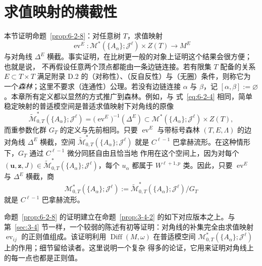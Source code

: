 
\section{求值映射的横截性}\label{sec:6-3}

本节证明命题~\ref{prop:6-2-8}：对任意树 $T$，求值映射
\[
  \operatorname{ev}^E:
  \mathcal M^*(\{A_\alpha\};\mathcal J^\ell)\times Z(T)
  \longrightarrow M^E
\]
与对角线 $\Delta^E$ 横截。事实证明，在比树更一般的对象上证明这个结果会很方便；也就是说，
不再假设任意两个顶点都能由一条边链连接。若有限集 $T$ 配备的关系
$E\subset T\times T$ 满足附录 D.2 的（对称性）、（反自反性）与（无圈）条件，则称它为
一个\emph{森林}；这里不要求（连通性）公理。若没有边链连接 $\alpha$ 与 $\beta$，记
$[\alpha,\beta]:=\varnothing$。本章所有定义都以显然的方式推广到森林。例如，与
式~\eqref{eq:6-2-4} 相同，简单稳定映射的普适模空间是普适求值映射下对角线的原像
\[
  \widetilde{\mathcal M}^*_{0,T}(\{A_\alpha\};\mathcal J^\ell)
  =\bigl(\operatorname{ev}^E\bigr)^{-1}(\Delta^E)
  \subset
  \mathcal M^*(\{A_\alpha\};\mathcal J^\ell)\times Z(T),
\]
而重参数化群 $G_T$ 的定义与先前相同。只要 $\operatorname{ev}^E$ 与带标号森林
$(T,E,\Lambda)$ 的边对角线 $\Delta^E$ 横截，空间
$\widetilde{\mathcal M}^*_{0,T}(\{A_\alpha\};\mathcal J^\ell)$ 就是
$C^{\ell-1}$ 巴拿赫流形。在这种情形下，$G_T$ 通过 $C^{\ell-1}$ 微分同胚自由且恰当地
作用在这个空间上，因为对每个
$(\mathbf u,\mathbf z,J)\in
\widetilde{\mathcal M}^*_{0,T}(\{A_\alpha\};\mathcal J^\ell)$，每个 $u_\alpha$ 都属于
$W^{\ell+1,p}$ 类。因此，只要 $\operatorname{ev}^E$ 与 $\Delta^E$ 横截，商
\[
  \mathcal M^*_{0,T}(\{A_\alpha\};\mathcal J^\ell)
  :=\widetilde{\mathcal M}^*_{0,T}
  (\{A_\alpha\};\mathcal J^\ell)/G_T
\]
就是 $C^{\ell-1}$ 巴拿赫流形。

命题~\ref{prop:6-2-8} 的证明建立在命题~\ref{prop:3-4-2} 的如下对应版本之上。与
第~\ref{sec:3-4} 节一样，一个较弱的陈述有初等证明：对角线的补集完全由求值映射
$\operatorname{ev}_{ij}$ 的正则值组成。该证明利用
$\operatorname{Diff}(M,\omega)$ 在普适模空间
$\mathcal M^*_{0,T}(\{A_\alpha\};\mathcal J^\ell)$ 上的作用；细节留给读者。这里说明一个复杂
得多的论证，它用来证明对角线上的每一点也都是正则值。

